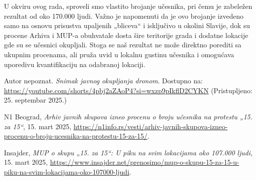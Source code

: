 \documentclass[a4paper,12pt]{article}
\begin{document}
U okviru ovog rada, sproveli smo vlastito brojanje učesnika, pri čemu je zabeležen rezultat od oko 170.000 ljudi. Važno je napomenuti da je ovo brojanje izvedeno samo na osnovu prisustva upaljenih „bliceva“ i isključivo u okolini Slavije, dok su procene Arhiva i MUP-a obuhvatale dosta šire teritorije grada i dodatne lokacije gde su se učesnici okupljali. Stoga se naš rezultat ne može direktno porediti sa ukupnim procenama, ali pruža uvid u lokalnu gustinu učesnika i omogućava uporedivu kvantifikaciju na odabranoj lokaciji.
\newpage
\begin{thebibliography}{9}

	Autor nepoznat. 
	\textit{Snimak javnog okupljanja dronom}. 
	Dostupno na: \url{https://youtube.com/shorts/4pbj2aZAoP4?si=wxzp9pIkflD2CYKN} 
	(Pristupljeno: 25. septembar 2025.)
	
	N1 Beograd,
	\emph{Arhiv javnih skupova izneo procenu o broju učesnika na protestu „15. za 15“},
	15. mart 2025,
	\url{https://n1info.rs/vesti/arhiv-javnih-skupova-izneo-procenu-o-broju-ucesnika-na-protestu-15-za-15/}.

	Insajder,
	\emph{MUP o skupu „15. za 15“: U piku na svim lokacijama oko 107.000 ljudi},
	15. mart 2025,
	\url{https://www.insajder.net/prenosimo/mup-o-skupu-15-za-15-u-piku-na-svim-lokacijama-oko-107000-ljudi}.

	\end{thebibliography}
\end{document}

